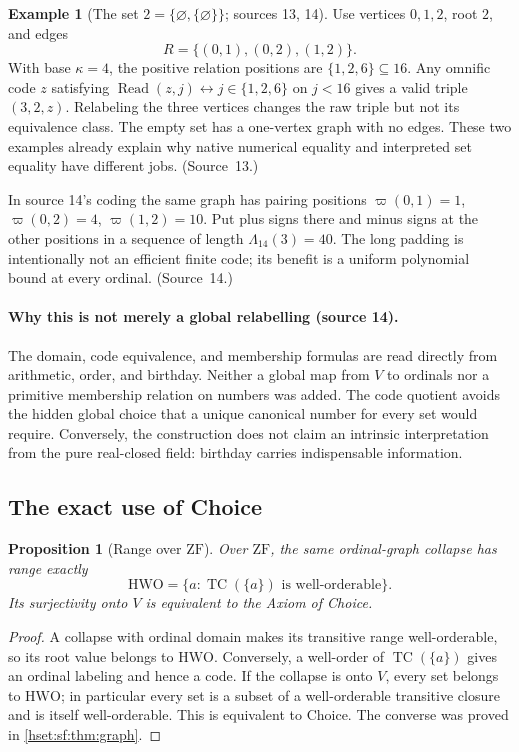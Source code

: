 \documentclass[11pt,letterpaper]{article}
\newtheorem{proposition}[proposition]{Proposition}\aliascntresetthe{proposition}
\theoremstyle{definition}
\newtheorem{example}[example]{Example}\aliascntresetthe{example}
\theoremstyle{remark}
\newcommand{\TC}{\operatorname{TC}}
\newcommand{\HWO}{\mathrm{HWO}}
\newcommand{\ZF}{\mathrm{ZF}}
\newcommand{\Readp}{\operatorname{Read}}
\begin{document}
\begin{example}[The set $2=\{\varnothing,\{\varnothing\}\}$; sources 13, 14]
\label{hset:sf:ex:two}
Use vertices $0,1,2$, root $2$, and edges
\[
 R=\{(0,1),(0,2),(1,2)\}.
\]
With base $\kappa=4$, the positive relation positions are $\{1,2,6\}\subseteq16$.
Any omnific code $z$ satisfying $\Readp(z,j)\leftrightarrow j\in\{1,2,6\}$ on
$j<16$ gives a valid triple $(3,2,z)$. Relabeling the three vertices changes the
raw triple but not its equivalence class. The empty set has a one-vertex graph
with no edges. These two examples already explain why native numerical equality
and interpreted set equality have different jobs. (Source~13.)

In source 14's coding the same graph has pairing positions $\varpi(0,1)=1$,
$\varpi(0,2)=4$, $\varpi(1,2)=10$. Put plus signs there and minus signs at the other
positions in a sequence of length $\Lambda_{14}(3)=40$. The long padding is
intentionally not an efficient finite code; its benefit is a uniform polynomial
bound at every ordinal. (Source~14.)
\end{example}

\paragraph{Why this is not merely a global relabelling (source 14).} The domain,
code equivalence, and membership formulas are read directly from arithmetic,
order, and birthday. Neither a global map from $V$ to ordinals nor a primitive
membership relation on numbers was added. The code quotient avoids the hidden
global choice that a unique canonical number for every set would require.
Conversely, the construction does not claim an intrinsic interpretation from the
pure real-closed field: birthday carries indispensable information.

\subsection{The exact use of Choice}\label{hset:sf:sub:choice}

\begin{proposition}[Range over $\ZF$]\label{hset:sf:prop:hwo}
Over $\ZF$, the same ordinal-graph collapse has range exactly
\[
 \HWO=\{a:\TC(\{a\})\text{ is well-orderable}\}.
\]
Its surjectivity onto $V$ is equivalent to the Axiom of Choice.
\end{proposition}
\begin{proof}
A collapse with ordinal domain makes its transitive range well-orderable, so its
root value belongs to $\HWO$. Conversely, a well-order of $\TC(\{a\})$ gives an
ordinal labeling and hence a code. If the collapse is onto $V$, every set belongs
to $\HWO$; in particular every set is a subset of a well-orderable transitive
closure and is itself well-orderable. This is equivalent to Choice. The converse
was proved in \cref{hset:sf:thm:graph}.
\end{proof}
\end{document}
